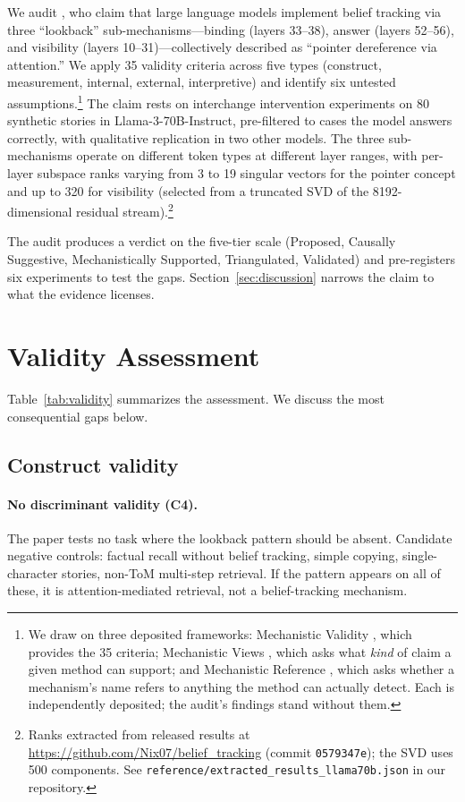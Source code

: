 \documentclass[11pt]{article}
\begin{document}
We audit \citet{prakash2025lookback}, who claim that large language models implement belief tracking via three ``lookback'' sub-mechanisms---binding (layers 33--38), answer (layers 52--56), and visibility (layers 10--31)---collectively described as ``pointer dereference via attention.'' We apply 35 validity criteria across five types (construct, measurement, internal, external, interpretive) and identify six untested assumptions.\footnote{We draw on three deposited frameworks: Mechanistic Validity \citep{tower2026mechval}, which provides the 35 criteria; Mechanistic Views \citep{tower2026mechviews}, which asks what \emph{kind} of claim a given method can support; and Mechanistic Reference \citep{tower2026mechref}, which asks whether a mechanism's name refers to anything the method can actually detect. Each is independently deposited; the audit's findings stand without them.} The claim rests on interchange intervention experiments on 80 synthetic stories in Llama-3-70B-Instruct, pre-filtered to cases the model answers correctly, with qualitative replication in two other models. The three sub-mechanisms operate on different token types at different layer ranges, with per-layer subspace ranks varying from 3 to 19 singular vectors for the pointer concept and up to 320 for visibility (selected from a truncated SVD of the 8192-dimensional residual stream).\footnote{Ranks extracted from released results at \url{https://github.com/Nix07/belief_tracking} (commit \texttt{0579347e}); the SVD uses 500 components. See \texttt{reference/extracted\_results\_llama70b.json} in our repository.}

The audit produces a verdict on the five-tier scale (Proposed, Causally Suggestive, Mechanistically Supported, Triangulated, Validated) and pre-registers six experiments to test the gaps. Section~\ref{sec:discussion} narrows the claim to what the evidence licenses.


\section{Validity Assessment}
\label{sec:validity}

Table~\ref{tab:validity} summarizes the assessment. We discuss the most consequential gaps below.

\subsection{Construct validity}

\paragraph{No discriminant validity (C4).}
The paper tests no task where the lookback pattern should be absent. Candidate negative controls: factual recall without belief tracking, simple copying, single-character stories, non-ToM multi-step retrieval. If the pattern appears on all of these, it is attention-mediated retrieval, not a belief-tracking mechanism.
\end{document}
